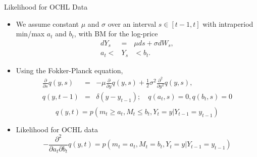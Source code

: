 \documentclass{beamer}
\begin{document}
\begin{frame}{Likelihood for OCHL Data}
\begin{itemize}
	\item We assume constant $\mu$ and $\sigma$ over an interval $s \in [t-1,t]$ with intraperiod min/max $a_t$ and $b_t$,	with BM for the log-price
\begin{eqnarray*}
	dY_s &=& \mu ds + \sigma dW_s, \label{eq:SDE-bc-1} \\
	a_t < &Y_s& < b_t. \label{eq:SDE-bc-2}
\end{eqnarray*}

\pause
	\item Using the Fokker-Planck equation,
\begin{eqnarray*}
	\frac{\partial}{\partial s} q(y,s) &=& -\mu \frac{\partial}{\partial y}q(y,s) + \frac{1}{2}\sigma^2 \frac{\partial^2}{\partial y^2} q(y,s),  \label{eq:IV-BC-1} \\
	q(y,t-1) &=& \delta(y-y_{t-1}); \quad q(a_t,s) = 0, q(b_t, s) = 0 \label{eq:IV-BC-2} \\ 
\end{eqnarray*}
\vspace{-10mm}
\[
\boxed{
	q(y,t) = p( m_t \geq a_t, M_t \leq b_t, Y_t = y | Y_{t-1} = y_{t-1})
}
\]
\pause
\vspace{-2mm}
	\item 
Likelihood for OCHL data
\[ 
\boxed{
-\frac{\partial^2 }{\partial a_t \partial b_t } q(y,t) = p( m_t = a_t, M_t = b_t, Y_t = y | Y_{t-1} = y_{t-1})
}
\]
\end{itemize}
\end{frame}
\end{document}
